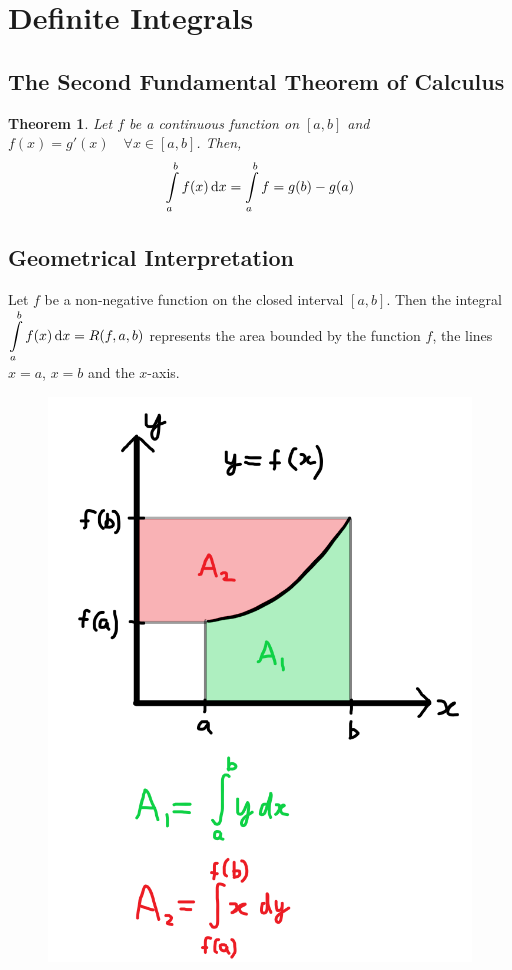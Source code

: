 \documentclass[14]{article}
\newtheorem{theorem}{Theorem}
\theoremstyle{definition}
\theoremstyle{case}
\begin{document}
\section{Definite Integrals}
\subsection{The Second Fundamental Theorem of Calculus}
\begin{theorem}
Let $f$ be a continuous function on $[a, b]$ and $f(x) = g'(x) \quad \forall x \in [a,b]$. Then,
\[\int\limits_a^b f(x) \dif x = \int\limits_a^b f = g(b) - g(a)\]
\end{theorem}
\subsection{Geometrical Interpretation}
Let $f$ be a non-negative function on the closed interval $[a, b]$. Then the integral $\displaystyle \int\limits_a^b f(x) \dif x = R(f, a, b)$ represents the area bounded by the function $f$, the lines $x = a$, $x = b$ and the $x$-axis.
\begin{figure}[h]
\includegraphics[scale=0.5]{images/integral_area}
\end{figure}
\pagebreak
\end{document}
